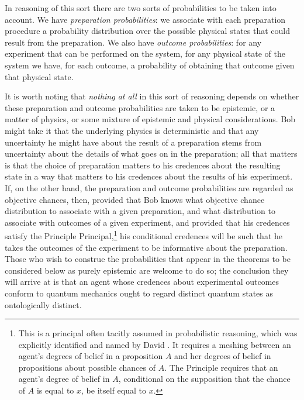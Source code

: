 \documentclass[12pt]{article}
\begin{document}
In reasoning of this sort there are two sorts of probabilities to be taken into account.  We have \emph{preparation probabilities}: we associate with each preparation procedure  a probability distribution over the possible physical states that could result from the preparation. We also have \emph{outcome probabilities}: for any experiment that can be performed on the system, for any physical state of the system we have, for each outcome, a  probability of obtaining that outcome given that physical state.

It is worth noting that \emph{nothing at all} in this sort of reasoning depends on whether these preparation and outcome probabilities are taken to be epistemic, or a matter of physics, or some mixture of epistemic and physical considerations. Bob might take it that the underlying physics is deterministic and that any uncertainty he might have about the result of a preparation stems from uncertainty about the details of what goes on in the preparation; all that matters  is that the choice of preparation matters to his credences about the resulting state in a way that matters to his credences about the results of his experiment.  If, on the other hand, the preparation and outcome probabilities are regarded as objective chances, then, provided that Bob knows what objective chance distribution to associate with a given preparation, and what distribution to associate with outcomes of a given experiment, and provided that his credences satisfy the Principle Principal,\footnote{This is a principal often tacitly assumed in probabilistic reasoning, which was explicitly identified and named by David \citet{LewisSGOC}.  It requires a meshing between an agent's degrees of belief in a proposition $A$ and her degrees of belief in propositions about possible chances of $A$.  The Principle requires that an agent's degree of belief in $A$, conditional on the supposition that the chance of $A$ is equal to $x$, be itself equal to $x$. } his conditional credences will be such that he takes the outcomes of the experiment to be informative about the preparation.  Those who wish to construe the probabilities that appear in the theorems to be considered below as purely epistemic are welcome to do so; the conclusion they will arrive at is that an agent whose credences about experimental outcomes conform to quantum mechanics ought to regard distinct quantum states as ontologically distinct.
\end{document}
